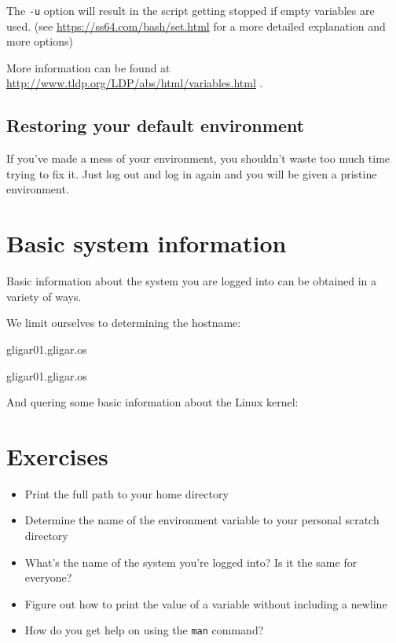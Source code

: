 The \lstinline|-u| option will result in the script getting stopped if empty variables are used.
(see \url{https://ss64.com/bash/set.html} for a more detailed explanation and more options)

More information can be found at \url{http://www.tldp.org/LDP/abs/html/variables.html} .

\subsection{Restoring your default environment}

If you've made a mess of your environment, you shouldn't waste too much time
trying to fix it. Just log out and log in again and you will be given a
pristine environment.

\section{Basic system information}

Basic information about the system you are logged into can be obtained in a variety of ways.

We limit ourselves to determining the hostname:

\begin{prompt}
  gligar01.gligar.os

  gligar01.gligar.os
\end{prompt}

And quering some basic information about the Linux kernel:


\section{Exercises}

\begin{itemize}
    \item Print the full path to your home directory
    \item Determine the name of the environment variable to your personal scratch directory
    \item What's the name of the system you're logged into? Is it the same for everyone?
    \item Figure out how to print the value of a variable without including a newline
    \item How do you get help on using the \lstinline|man| command?
\end{itemize}
